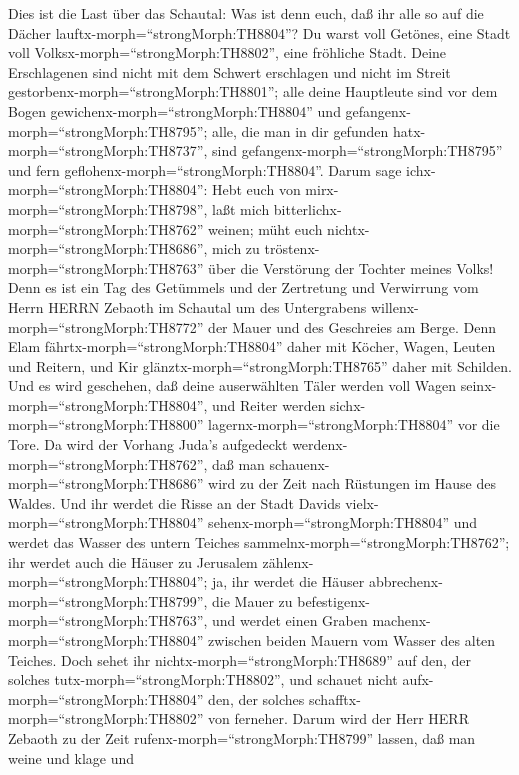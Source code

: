  Dies ist die Last über das Schautal: Was ist denn euch, daß
ihr alle so auf die Dächer lauftx-morph=``strongMorph:TH8804''?
 Du warst voll Getönes, eine Stadt voll
Volksx-morph=``strongMorph:TH8802'', eine fröhliche Stadt. Deine
Erschlagenen sind nicht mit dem Schwert erschlagen und nicht im Streit
gestorbenx-morph=``strongMorph:TH8801'';  alle deine
Hauptleute sind vor dem Bogen gewichenx-morph=``strongMorph:TH8804'' und
gefangenx-morph=``strongMorph:TH8795''; alle, die man in dir gefunden
hatx-morph=``strongMorph:TH8737'', sind
gefangenx-morph=``strongMorph:TH8795'' und fern
geflohenx-morph=``strongMorph:TH8804''.  Darum sage
ichx-morph=``strongMorph:TH8804'': Hebt euch von
mirx-morph=``strongMorph:TH8798'', laßt mich
bitterlichx-morph=``strongMorph:TH8762'' weinen; müht euch
nichtx-morph=``strongMorph:TH8686'', mich zu
tröstenx-morph=``strongMorph:TH8763'' über die Verstörung der Tochter
meines Volks!  Denn es ist ein Tag des Getümmels und der
Zertretung und Verwirrung vom Herrn HERRN Zebaoth im Schautal um des
Untergrabens willenx-morph=``strongMorph:TH8772'' der Mauer und des
Geschreies am Berge.  Denn Elam
fährtx-morph=``strongMorph:TH8804'' daher mit Köcher, Wagen, Leuten und
Reitern, und Kir glänztx-morph=``strongMorph:TH8765'' daher mit
Schilden.  Und es wird geschehen, daß deine auserwählten
Täler werden voll Wagen seinx-morph=``strongMorph:TH8804'', und Reiter
werden sichx-morph=``strongMorph:TH8800''
lagernx-morph=``strongMorph:TH8804'' vor die Tore.  Da wird
der Vorhang Juda's aufgedeckt werdenx-morph=``strongMorph:TH8762'', daß
man schauenx-morph=``strongMorph:TH8686'' wird zu der Zeit nach
Rüstungen im Hause des Waldes.  Und ihr werdet die Risse an
der Stadt Davids vielx-morph=``strongMorph:TH8804''
sehenx-morph=``strongMorph:TH8804'' und werdet das Wasser des untern
Teiches sammelnx-morph=``strongMorph:TH8762'';  ihr werdet
auch die Häuser zu Jerusalem zählenx-morph=``strongMorph:TH8804''; ja,
ihr werdet die Häuser abbrechenx-morph=``strongMorph:TH8799'', die Mauer
zu befestigenx-morph=``strongMorph:TH8763'',  und werdet
einen Graben machenx-morph=``strongMorph:TH8804'' zwischen beiden Mauern
vom Wasser des alten Teiches. Doch sehet ihr
nichtx-morph=``strongMorph:TH8689'' auf den, der solches
tutx-morph=``strongMorph:TH8802'', und schauet nicht
aufx-morph=``strongMorph:TH8804'' den, der solches
schafftx-morph=``strongMorph:TH8802'' von ferneher.  Darum
wird der Herr HERR Zebaoth zu der Zeit
rufenx-morph=``strongMorph:TH8799'' lassen, daß man weine und klage und
